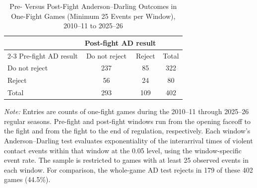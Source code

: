 \begin{table}[htbp]
\centering
\caption{Pre- Versus Post-Fight Anderson--Darling Outcomes in One-Fight Games (Minimum 25 Events per Window), 2010--11 to 2025--26}
\label{tab:one_fight_AD_rejection_min_25_20102011_20252026}
\small
\renewcommand{\arraystretch}{1.15}
\setlength{\tabcolsep}{6pt}

\begin{tabular*}{0.78\textwidth}{@{\extracolsep{\fill}}lccc}
\toprule
 & \multicolumn{2}{c}{Post-fight AD result} & \\
\cmidrule(lr){2-3}
Pre-fight AD result & Do not reject & Reject & Total \\
\midrule
Do not reject & 237 & 85 & 322 \\
Reject & 56 & 24 & 80 \\
\midrule
Total & 293 & 109 & 402 \\
\bottomrule
\end{tabular*}

\vspace{0.4em}
\parbox{0.78\textwidth}{
\footnotesize
\textit{Note:} Entries are counts of one-fight games during the 2010--11 through 2025--26 regular seasons. Pre-fight and post-fight windows run from the opening faceoff to the fight and from the fight to the end of regulation, respectively. Each window's Anderson--Darling test evaluates exponentiality of the interarrival times of violent contact events within that window at the 0.05 level, using the window-specific event rate. The sample is restricted to games with at least 25 observed events in each window. For comparison, the whole-game AD test rejects in 179 of these 402 games (44.5\%).
}
\end{table}
